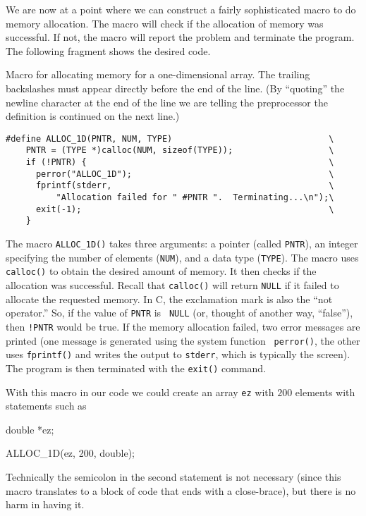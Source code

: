 We are now at a point where we can construct a fairly sophisticated
macro to do memory allocation.  The macro will check if the allocation
of memory was successful.  If not, the macro will report the problem
and terminate the program.  The following fragment shows the desired
code.
\begin{fragment}
Macro for allocating memory for a one-dimensional array.  The trailing
backslashes must appear directly before the end of the line.  (By
``quoting'' the newline character at the end of the line we are
telling the preprocessor the definition is continued on the next
line.)
\label{frag:allocMacro}
\codemiddle
\begin{lstlisting}
#define ALLOC_1D(PNTR, NUM, TYPE)                               \
    PNTR = (TYPE *)calloc(NUM, sizeof(TYPE));                   \
    if (!PNTR) {                                                \
      perror("ALLOC_1D");                                       \
      fprintf(stderr,                                           \
          "Allocation failed for " #PNTR ".  Terminating...\n");\
      exit(-1);                                                 \
    }
\end{lstlisting}
\end{fragment}

The macro {\tt ALLOC\_1D()} takes three arguments: a pointer (called
{\tt PNTR}), an integer specifying the number of elements ({\tt NUM}),
and a data type ({\tt TYPE}).  The macro uses {\tt calloc()} to obtain
the desired amount of memory.  It then checks if the allocation was
successful.  Recall that {\tt calloc()} will return {\tt NULL} if it
failed to allocate the requested memory.  In C, the exclamation mark
is also the ``not operator.''  So, if the value of {\tt PNTR} is {\tt
  NULL} (or, thought of another way, ``false''), then {\tt !PNTR}
would be true.  If the memory allocation failed, two error messages
are printed (one message is generated using the system function {\tt
  perror()}, the other uses {\tt fprintf()} and writes the output to
{\tt stderr}, which is typically the screen).  The program is then
terminated with the {\tt exit()} command.

With this macro in our code we could create an array {\tt ez} with
$200$ elements with statements such as
\begin{code}
double *ez;

ALLOC_1D(ez, 200, double);
\end{code}
Technically the semicolon in the second statement is not necessary
(since this macro translates to a block of code that ends with a
close-brace), but there is no harm in having it.

